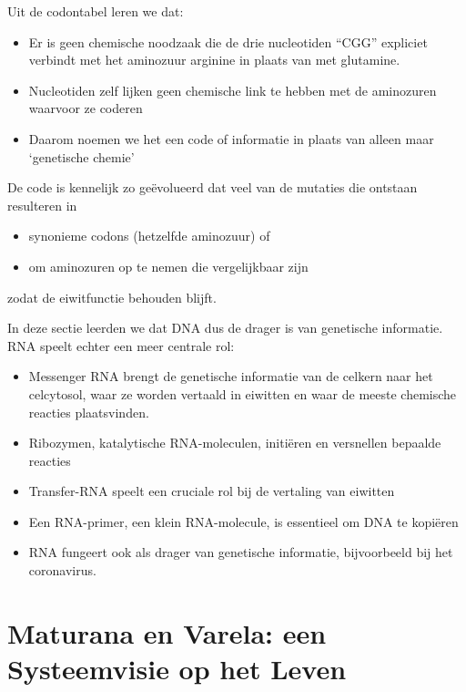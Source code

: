 \documentclass[
  11pt,
]{book}
\providecommand{\tightlist}{%
  \setlength{\itemsep}{0pt}\setlength{\parskip}{0pt}}
\begin{document}
Uit de codontabel leren we dat:

\begin{itemize}
\item
  Er is geen chemische noodzaak die de drie nucleotiden ``CGG'' expliciet verbindt met het aminozuur arginine in plaats van met glutamine.
\item
  Nucleotiden zelf lijken geen chemische link te hebben met de aminozuren waarvoor ze coderen
\item
  Daarom noemen we het een code of informatie in plaats van alleen maar `genetische chemie'
\end{itemize}

De code is kennelijk zo geëvolueerd dat veel van de mutaties die ontstaan resulteren in

\begin{itemize}
\tightlist
\item
  synonieme codons (hetzelfde aminozuur) of
\item
  om aminozuren op te nemen die vergelijkbaar zijn
\end{itemize}

zodat de eiwitfunctie behouden blijft.

In deze sectie leerden we dat DNA dus de drager is van genetische informatie. RNA speelt echter een meer centrale rol:

\begin{itemize}
\item
  Messenger RNA brengt de genetische informatie van de celkern naar het celcytosol, waar ze worden vertaald in eiwitten en waar de meeste chemische reacties plaatsvinden.
\item
  Ribozymen, katalytische RNA-moleculen, initiëren en versnellen bepaalde reacties
\item
  Transfer-RNA speelt een cruciale rol bij de vertaling van eiwitten
\item
  Een RNA-primer, een klein RNA-molecule, is essentieel om DNA te kopiëren
\item
  RNA fungeert ook als drager van genetische informatie, bijvoorbeeld bij het coronavirus.
\end{itemize}

\newpage

\hypertarget{maturanaVarela}{%
\section{Maturana en Varela: een Systeemvisie op het Leven}\label{maturanaVarela}}
\end{document}
